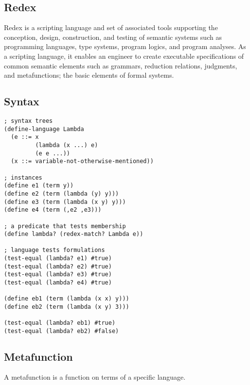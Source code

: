 \subsection{Redex}

Redex is a scripting language and set of associated tools
supporting the conception, design, construction, and testing of semantic systems
such as programming languages, type systems, program logics, and program
analyses. As a scripting language, it enables an engineer to create executable
specifications of common semantic elements such as grammars, reduction
relations, judgments, and metafunctions; the basic elements of formal systems.

\subsection{Syntax}

\begin{lstlisting}[frame=none,numbers=none]
; syntax trees
(define-language Lambda
  (e ::= x
         (lambda (x ...) e)
         (e e ...))
  (x ::= variable-not-otherwise-mentioned))

; instances
(define e1 (term y))
(define e2 (term (lambda (y) y)))
(define e3 (term (lambda (x y) y)))
(define e4 (term (,e2 ,e3)))

; a predicate that tests membership
(define lambda? (redex-match? Lambda e))

; language tests formulations
(test-equal (lambda? e1) #true)
(test-equal (lambda? e2) #true)
(test-equal (lambda? e3) #true)
(test-equal (lambda? e4) #true)

(define eb1 (term (lambda (x x) y)))
(define eb2 (term (lambda (x y) 3)))

(test-equal (lambda? eb1) #true)
(test-equal (lambda? eb2) #false)
\end{lstlisting}

\subsection{Metafunction}

A metafunction is a function on terms of a specific language.

